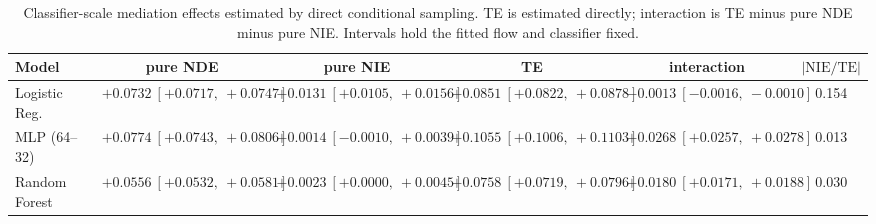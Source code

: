 \begin{table}[htbp]
  \centering
  \caption{Classifier-scale mediation effects estimated by direct conditional sampling. TE is estimated directly; interaction is TE minus pure NDE minus pure NIE. Intervals hold the fitted flow and classifier fixed.}
  \label{tab:acs_gap_overall}
  \begin{tabular}{lccccc}
    \toprule
    Model & pure NDE & pure NIE & TE & interaction & $|\mathrm{NIE}/\mathrm{TE}|$ \\
    \midrule
    Logistic Reg. & $+0.0732\ [+0.0717,\ +0.0747]$ & $+0.0131\ [+0.0105,\ +0.0156]$ & $+0.0851\ [+0.0822,\ +0.0878]$ & $-0.0013\ [-0.0016,\ -0.0010]$ & 0.154 \\
    MLP (64--32) & $+0.0774\ [+0.0743,\ +0.0806]$ & $+0.0014\ [-0.0010,\ +0.0039]$ & $+0.1055\ [+0.1006,\ +0.1103]$ & $+0.0268\ [+0.0257,\ +0.0278]$ & 0.013 \\
    Random Forest & $+0.0556\ [+0.0532,\ +0.0581]$ & $+0.0023\ [+0.0000,\ +0.0045]$ & $+0.0758\ [+0.0719,\ +0.0796]$ & $+0.0180\ [+0.0171,\ +0.0188]$ & 0.030 \\
    \bottomrule
  \end{tabular}
\end{table}